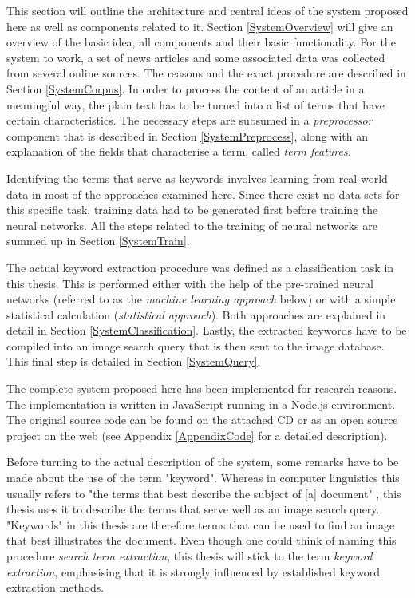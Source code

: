 \documentclass[11pt,a4paper,twoside]{article}
\begin{document}
This section will outline the architecture and central ideas of the system proposed here as well as components related to it. Section \ref{SystemOverview} will give an overview of the basic idea, all components and their basic functionality. For the system to work, a set of news articles and some associated data was collected from several online sources. The reasons and the exact procedure are described in Section \ref{SystemCorpus}. In order to process the content of an article in a meaningful way, the plain text has to be turned into a list of terms that have certain characteristics. The necessary steps are subsumed in a \emph{preprocessor} component that is described in Section \ref{SystemPreprocess}, along with an explanation of the fields that characterise a term, called \emph{term features}.

Identifying the terms that serve as keywords involves learning from real-world data in most of the approaches examined here. Since there exist no data sets for this specific task, training data had to be generated first before training the neural networks. All the steps related to the training of neural networks are summed up in Section \ref{SystemTrain}.

The actual keyword extraction procedure was defined as a classification task in this thesis. This is performed either with the help of the pre-trained neural networks (referred to as the \emph{machine learning approach} below) or with a simple statistical calculation (\emph{statistical approach}). Both approaches are explained in detail in Section \ref{SystemClassification}. Lastly, the extracted keywords have to be compiled into an image search query that is then sent to the image database. This final step is detailed in Section \ref{SystemQuery}.

The complete system proposed here has been implemented for research reasons. The implementation is written in JavaScript running in a Node.js environment. The original source code can be found on the attached CD or as an open source project on the web (see Appendix \ref{AppendixCode} for a detailed description).

Before turning to the actual description of the system, some remarks have to be made about the use of the term "keyword". Whereas in computer linguistics this usually refers to "the terms that best describe the subject of [a] document" \cite[p. 1]{Beliga2014KeywordApproaches}, this thesis uses it to describe the terms that serve well as an image search query. "Keywords" in this thesis are therefore terms that can be used to find an image that best illustrates the document. Even though one could think of naming this procedure \emph{search term extraction}, this thesis will stick to the term \emph{keyword extraction}, emphasising that it is strongly influenced by established keyword extraction methods.
\end{document}
